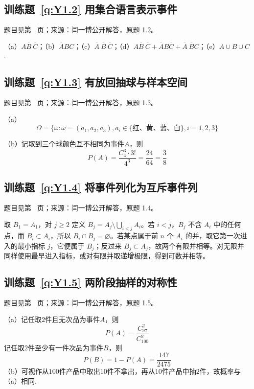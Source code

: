 \documentclass[UTF8,12pt,a4paper,fontset=fandol]{ctexbook}
\begin{document}
\subsection*{训练题~\ref{q:Y1.2} 用集合语言表示事件}\label{a:Y1.2}{\small 题目见第~\pageref{q:Y1.2} 页；来源：闫一博公开解答，原题 1.2。}
\begin{solve}
（a）$A\overline{B}\:{\overline{C}}$；（b）$\overline{A}BC$；（c）$\overline{A}\:\overline{B}\:\overline{C}$；（d）$A\overline{B}\:\overline{C}+\overline{A}B\overline{C}+\overline{A}\:\overline{B}C$；（e）$A\cup B\cup C$.
\end{solve}

\subsection*{训练题~\ref{q:Y1.3} 有放回抽球与样本空间}\label{a:Y1.3}{\small 题目见第~\pageref{q:Y1.3} 页；来源：闫一博公开解答，原题 1.3。}
\begin{solve}
（a）
\[\Omega  = \{ \omega :\omega  = ({a_1},{a_2},{a_3}),{a_i} \in \{\text{红、黄、蓝、白} \} ,i = 1,2,3\} \]

（b）记取到三个球颜色互不相同为事件$A$，则
\[P(A) = \frac{{C_4^3}\cdot 3!}{{{4^3}}} = \frac{{24}}{{64}} = \frac{3}{8}\]
\end{solve}

\subsection*{训练题~\ref{q:Y1.4} 将事件列化为互斥事件列}\label{a:Y1.4}{\small 题目见第~\pageref{q:Y1.4} 页；来源：闫一博公开解答，原题 1.4。}
\begin{solve}取 $B_1=A_1$，对 $j\ge2$ 定义 $B_j=A_j\setminus\bigcup_{i<j}A_i$。若 $i<j$，$B_j$ 不含 $A_i$ 中的任何点，而 $B_i\subset A_i$，所以 $B_i\cap B_j=\varnothing$。若某点属于前 $n$ 个 $A_i$ 的并，取它第一次进入的最小指标 $j$，它便属于 $B_j$；反过来 $B_j\subset A_j$，故两个有限并相等。对无限并同样使用最早进入指标，或对有限并取递增极限，得到可数并相等。\end{solve}

\subsection*{训练题~\ref{q:Y1.5} 两阶段抽样的对称性}\label{a:Y1.5}{\small 题目见第~\pageref{q:Y1.5} 页；来源：闫一博公开解答，原题 1.5。}
\begin{solve}
（a）记任取$2$件且无次品为事件$A$，则
\[P(A) = \frac{{C_{97}^2}}{{C_{100}^2}} \]
记任取$2$件至少有一件次品为事件$B$，则
\[
P(B)=1-P(A)=\frac{147}{2475}
\]
（b）可视作从$100$件产品中取出$10$件不拿出，再从$10$件产品中抽$2$件，故概率与（a）相同.
\end{solve}
\end{document}

